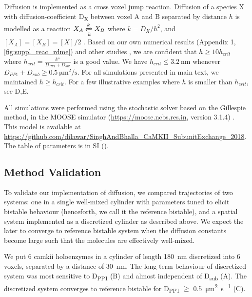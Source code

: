 \documentclass[9pt,lineno,doublespacing]{elife}
\newcommand\SUB[2]{#1\textsubscript{#2}}
\begin{document}
Diffusion is implemented as a cross voxel jump reaction. Diffusion of a species
X with diffusion-coefficient \SUB{D}{X} between voxel A and B separated by
distance $h$ is modelled as a reaction $X_A \xrightleftharpoons[k]{k} X_B$ where
\( k={D_X}/{h^2}\), and \([X_A]=[X_B]=[X]/2 \) \citep{erban_practical_2007}.
Based on our own numerical results (Appendix 1, \autoref{fig:suppl_reac_rdme})
and other studies
\citep{isaacson_reaction-diffusion_2009,erban_stochastic_2009}, we are confident
that \( h \ge 10h_{crit}\) where \(h_{crit}=\frac{k^+}{D_{PP1}+D_{sub}}\) is a
good value. We have \( h_{crit} \le \SI{3.2}{\nano\meter} \) whenever
$D_{PP1}+D_{sub}\ge\SI{0.5}{\micro\meter\squared\per\second}$. For all
simulations presented in main text, we maintained $h\ge h_{crit}$. For a few
illustrative examples where $h$ is smaller than $h_{crit}$, see
D,E. 

All simulations were performed using the stochastic solver based on the 
Gillespie method, in the 
MOOSE simulator (\url{https://moose.ncbs.res.in}, version 3.1.4)
\citep{ray_pymoose:_2008}. This model is available
at \url{https://github.com/dilawar/SinghAndBhalla_CaMKII_SubunitExchange_2018}.
The table of parameters is in SI ().

\subsection{Method Validation}

To validate our implementation of diffusion, we compared trajectories of two
systems: one in a single well-mixed cylinder with parameters tuned to
elicit bistable behaviour (henceforth, we call it the reference bistable), and a
spatial system implemented as a discretized cylinder as described above. We
expect the later to converge to reference bistable system when the diffusion
constants become large such that the molecules are effectively well-mixed. 

We put 6 \gls{camkii} holoenzymes in a cylinder of length \SI{180}{\nano\meter}
discretized into 6 voxels, separated by a distance of \SI{30}{\nano\meter}. The
long-term behaviour of discretized system was most sensitive to \SUB{D}{PP1}
(B) and almost independent of \SUB{D}{sub}
(A). The discretized system converges to reference
bistable for \SUB{D}{PP1} $\ge$ \SI{0.5}{\micro\meter\squared\per\second}
(C). 
\end{document}
